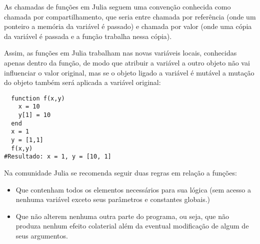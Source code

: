 As chamadas de funções em Julia seguem uma convenção conhecida como chamada por compartilhamento, que seria entre chamada por referência (onde um ponteiro a memória da variável é passado) e chamada por valor (onde uma cópia da variável é passada e a função trabalha nessa cópia).

Assim, as funções em Julia trabalham nas novas variáveis locais, conhecidas apenas dentro da função, de modo que atribuir a variável a outro objeto não vai influenciar o valor original, mas se o objeto ligado a variável é mutável a mutação do objeto também será aplicada a variável original:
\begin{lstlisting}
  function f(x,y) 
  	x = 10
  	y[1] = 10
  end
  x = 1
  y = [1,1]
  f(x,y)
#Resultado: x = 1, y = [10, 1]

\end{lstlisting}

Na comunidade Julia se recomenda seguir duas regras em relação a funções:%
\begin{itemize}
    \item Que contenham todos os elementos necessários para sua lógica (sem acesso a nenhuma variável exceto seus parâmetros e constantes globais.)
    \item Que não alterem nenhuma outra parte do programa, ou seja, que não produza nenhum efeito colaterial além da eventual modificação de algum de seus argumentos. 
\end{itemize}

